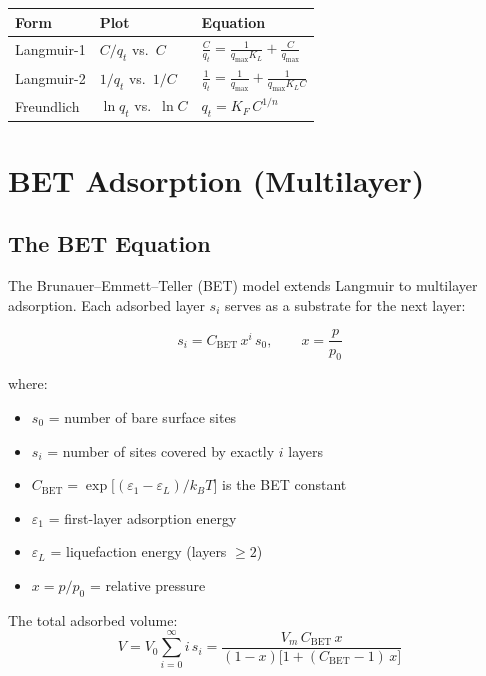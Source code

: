\documentclass[11pt]{article}
\begin{document}
\begin{center}
\begin{tabular}{lll}
\toprule
\textbf{Form} & \textbf{Plot} & \textbf{Equation} \\
\midrule
Langmuir-1 & $C/q_t$ vs.\ $C$
  & $\displaystyle \frac{C}{q_t} = \frac{1}{q_{\max} K_L} + \frac{C}{q_{\max}}$ \\[10pt]
Langmuir-2 & $1/q_t$ vs.\ $1/C$
  & $\displaystyle \frac{1}{q_t} = \frac{1}{q_{\max}} + \frac{1}{q_{\max} K_L C}$ \\[10pt]
Freundlich & $\ln q_t$ vs.\ $\ln C$
  & $\displaystyle q_t = K_F\, C^{1/n}$ \\
\bottomrule
\end{tabular}
\end{center}

\section{BET Adsorption (Multilayer)}

\subsection{The BET Equation}

The Brunauer--Emmett--Teller (BET) model extends Langmuir to multilayer
adsorption.  Each adsorbed layer $s_i$ serves as a substrate for the
next layer:

\begin{equation}
  s_i = C_{\text{BET}}\, x^{i}\, s_0,
  \qquad x = \frac{p}{p_0}
\end{equation}

where:
\begin{itemize}
  \item $s_0$ = number of bare surface sites
  \item $s_i$ = number of sites covered by exactly $i$ layers
  \item $C_{\text{BET}} = \exp\!\bigl[(\varepsilon_1 - \varepsilon_L)
        / k_B T\bigr]$ is the BET constant
  \item $\varepsilon_1$ = first-layer adsorption energy
  \item $\varepsilon_L$ = liquefaction energy (layers $\geq 2$)
  \item $x = p/p_0$ = relative pressure
\end{itemize}

The total adsorbed volume:
\begin{equation}
  V = V_0 \sum_{i=0}^{\infty} i\, s_i
    = \frac{V_m\, C_{\text{BET}}\, x}
           {(1 - x)\bigl[1 + (C_{\text{BET}} - 1)\, x\bigr]}
  \label{eq:bet}
\end{equation}
\end{document}
